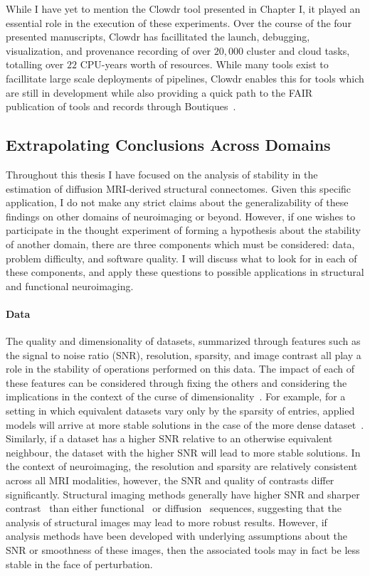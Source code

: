 While I have yet to mention the Clowdr tool presented in Chapter I, it played an essential role in the execution of
these experiments. Over the course of the four presented manuscripts, Clowdr has facillitated the launch, debugging,
visualization, and provenance recording of over $20,000$ cluster and cloud tasks, totalling over $22$ CPU-years
worth of resources. While many tools exist to facillitate large scale deployments of pipelines, Clowdr enables this
for tools which are still in development while also providing a quick path to the FAIR~\cite{wilkinson2016fair}
publication of tools and records through Boutiques~\cite{Glatard2018-tu}.

\subsection{Extrapolating Conclusions Across Domains}

Throughout this thesis I have focused on the analysis of stability in the estimation of diffusion MRI-derived
structural connectomes. Given this specific application, I do not make any strict claims about the generalizability
of these findings on other domains of neuroimaging or beyond. However, if one wishes to participate in the thought
experiment of forming a hypothesis about the stability of another domain, there are three components which must
be considered: data, problem difficulty, and software quality. I will discuss what to look for in each of these
components, and apply these questions to possible applications in structural and functional neuroimaging.

\paragraph{Data}
The quality and dimensionality of datasets, summarized through features such as the signal to noise ratio (SNR),
resolution, sparsity, and image contrast all play a role in the stability of operations performed on this data. The
impact of each of these features can be considered through fixing the others and considering the implications in the
context of the curse of dimensionality~\cite{friedman1997bias}. For example, for a setting in which equivalent
datasets vary only by the sparsity of entries, applied models will arrive at more stable solutions in the case of
the more dense dataset~\cite{geman1992neural}. Similarly, if a dataset has a higher SNR relative to an otherwise
equivalent neighbour, the dataset with the higher SNR will lead to more stable solutions. In the context of
neuroimaging, the resolution and sparsity are relatively consistent across all MRI modalities, however, the SNR and
quality of contrasts differ significantly. Structural imaging methods generally have higher SNR and sharper
contrast~\cite{bergamino2014review,chavhan2009principles} than either functional~\cite{logothetis2004nature} or
diffusion~\cite{thomason2011diffusion} sequences, suggesting that the analysis of structural images may lead to more
robust results. However, if analysis methods have been developed with underlying assumptions about the SNR or
smoothness of these images, then the associated tools may in fact be less stable in the face of perturbation.


